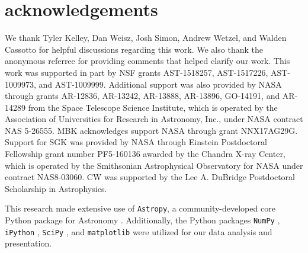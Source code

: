 \section*{acknowledgements} 
%
We thank Tyler Kelley, Dan Weisz, Josh Simon, Andrew Wetzel, and
Walden Cassotto for helpful discussions regarding this work.
We also thank the anonymous referree for providing comments that
helped clarify our work.
%
This work was supported in part by NSF grants AST-1518257,
AST-1517226, AST-1009973, and AST-1009999.
%
Additional support was also provided by NASA through grants AR-12836,
AR-13242, AR-13888, AR-13896, GO-14191, and AR-14289 from the Space Telescope
Science Institute, which is operated by the Association of Universities for
Research in Astronomy, Inc., under NASA contract NAS 5-26555.
%
MBK acknowledges support NASA through grant
NNX17AG29G.
%
Support for SGK was provided by NASA through Einstein Postdoctoral
Fellowship grant number PF5-160136 awarded by the Chandra X-ray
Center, which is operated by the Smithsonian Astrophysical Observatory
for NASA under contract NAS8-03060.
%
CW was supported by the Lee A. DuBridge Postdoctoral Scholarship in
Astrophysics. 
%


This research made extensive use of {\texttt{Astropy}},
a community-developed core Python package for Astronomy
\citep{astropy13}.
Additionally, the Python packages {\texttt{NumPy}} \citep{numpy},
{\texttt{iPython}} \citep{ipython}, {\texttt{SciPy}} \citep{scipy}, and
{\texttt{matplotlib}} \citep{matplotlib} were utilized for our data
analysis and presentation. 





\label{lastpage}


